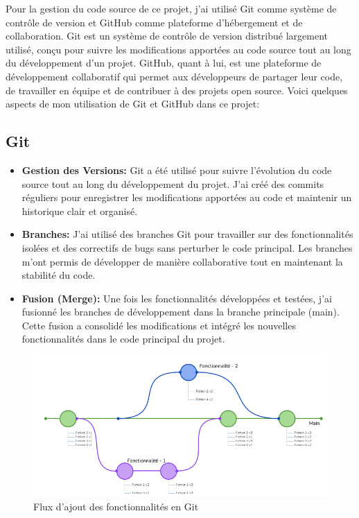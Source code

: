 \hspace{16pt}Pour la gestion du code source de ce projet, j'ai utilisé Git comme système de contrôle de version et GitHub comme plateforme d'hébergement et de collaboration. Git est un système de contrôle de version distribué largement utilisé, conçu pour suivre les modifications apportées au code source tout au long du développement d'un projet. GitHub, quant à lui, est une plateforme de développement collaboratif qui permet aux développeurs de partager leur code, de travailler en équipe et de contribuer à des projets open source. Voici quelques aspects de mon utilisation de Git et GitHub dans ce projet:

\subsection{Git}

\begin{itemize}
  \item \textbf{Gestion des Versions: }Git a été utilisé pour suivre l'évolution du code source tout au long du développement du projet. J'ai créé des commits réguliers pour enregistrer les modifications apportées au code et maintenir un historique clair et organisé.
  \item \textbf{Branches: }J'ai utilisé des branches Git pour travailler sur des fonctionnalités isolées et des correctifs de bugs sans perturber le code principal. Les branches m'ont permis de développer de manière collaborative tout en maintenant la stabilité du code.
  \item \textbf{Fusion (Merge): }Une fois les fonctionnalités développées et testées, j'ai fusionné les branches de développement dans la branche principale (main). Cette fusion a consolidé les modifications et intégré les nouvelles fonctionnalités dans le code principal du projet.
\end{itemize}

\begin{figure}[H] 
    \centering
    \includegraphics[width=18cm]{Figures/Git.png}
    \caption{Flux d'ajout des fonctionnalités en Git}
\end{figure}

